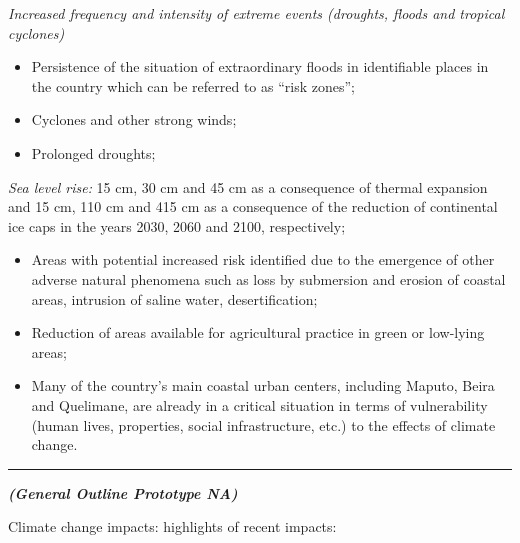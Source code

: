 \documentclass[
]{book}
\begin{document}
\emph{Increased frequency and intensity of extreme events (droughts, floods and tropical cyclones)}

\begin{itemize}
\item
  Persistence of the situation of extraordinary floods in identifiable places in the country which can be referred to as ``risk zones'';
\item
  Cyclones and other strong winds;
\item
  Prolonged droughts;
\end{itemize}

\emph{Sea level rise:}
15 cm, 30 cm and 45 cm as a consequence of thermal expansion and 15 cm, 110 cm and 415 cm as a consequence of the reduction of continental ice caps in the years 2030, 2060 and 2100, respectively;

\begin{itemize}
\item
  Areas with potential increased risk identified due to the emergence of other adverse natural phenomena such as loss by submersion and erosion of coastal areas, intrusion of saline water, desertification;
\item
  Reduction of areas available for agricultural practice in green or low-lying areas;
\item
  Many of the country's main coastal urban centers, including Maputo, Beira and Quelimane, are already in a critical situation in terms of vulnerability (human lives, properties, social infrastructure, etc.) to the effects of climate change.
\end{itemize}

\begin{center}\rule{0.5\linewidth}{0.5pt}\end{center}

\textbf{\emph{(General Outline Prototype NA)}}

Climate change impacts: highlights of recent impacts:
\end{document}
